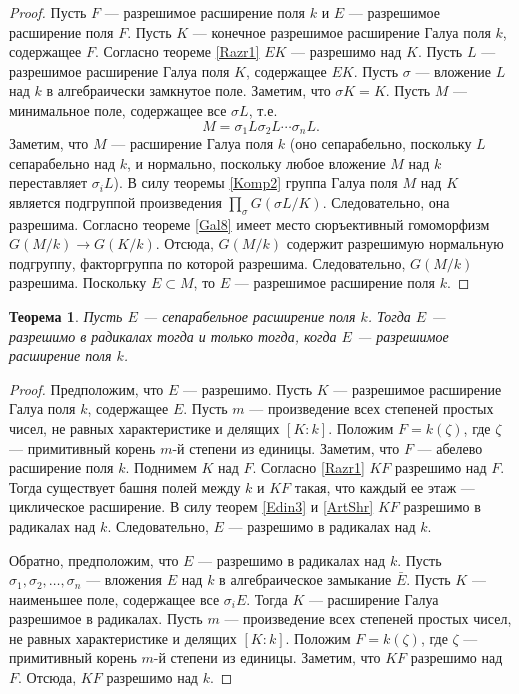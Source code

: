 \documentclass[12pt, titlepage, oneside]{amsbook}
\newtheorem{theorem}{Теорема}[chapter]
\theoremstyle{definition}
\theoremstyle{remark}
\begin{document}
\begin{proof}
Пусть $F$ --- разрешимое расширение поля $k$ и $E$ --- разрешимое расширение поля $F$. Пусть $K$ --- конечное разрешимое расширение Галуа поля $k$, содержащее $F$. Согласно теореме \ref{Razr1} $EK$ --- разрешимо над $K$. Пусть $L$ --- разрешимое расширение Галуа поля $K$, содержащее $EK$. Пусть $\sigma$ --- вложение $L$ над $k$ в алгебраически замкнутое поле. Заметим, что $\sigma K=K$. Пусть $M$ --- минимальное поле, содержащее все $\sigma L$, т.е. $$M=\sigma_1 L\sigma_2 L\cdots\sigma_n L.$$ Заметим, что $M$ --- расширение Галуа поля $k$ (оно сепарабельно, поскольку $L$ сепарабельно над $k$, и нормально, поскольку любое вложение $M$ над $k$ переставляет $\sigma_i L$). В силу теоремы \ref{Komp2} группа Галуа поля $M$ над $K$ является подгруппой произведения $\prod\limits_{\sigma} G(\sigma L/K)$. Следовательно, она разрешима. Согласно теореме \ref{Gal8} имеет место сюръективный гомоморфизм $G(M/k)\rightarrow G(K/k)$. Отсюда, $G(M/k)$ содержит разрешимую нормальную подгруппу, факторгруппа по которой разрешима. Следовательно, $G(M/k)$ разрешима. Поскольку $E\subset M$, то $E$ --- разрешимое расширение поля $k$.
\end{proof}

\begin{theorem}
\label{RazrRad}
Пусть $E$ --- сепарабельное расширение поля $k$. Тогда $E$ --- разрешимо в радикалах тогда и только тогда, когда $E$ --- разрешимое расширение поля $k$.
\end{theorem}


\begin{proof}
Предположим, что $E$ --- разрешимо. Пусть $K$ --- разрешимое расширение Галуа поля $k$, содержащее $E$. Пусть $m$ --- произведение всех степеней простых чисел, не равных характеристике и делящих $[K:k]$. Положим $F=k(\zeta)$, где $\zeta$ --- примитивный корень $m$-й степени из единицы. Заметим, что $F$ --- абелево расширение поля $k$. Поднимем $K$ над $F$. Согласно \ref{Razr1} $KF$ разрешимо над $F$. Тогда существует башня полей между $k$ и $KF$ такая, что каждый ее этаж --- циклическое расширение. В силу теорем \ref{Edin3} и \ref{ArtShr} $KF$ разрешимо в радикалах над $k$. Следовательно, $E$ --- разрешимо в радикалах над $k$.

Обратно, предположим, что $E$ --- разрешимо в радикалах над $k$. Пусть $\sigma_1,\sigma_2,\ldots,\sigma_n$ --- вложения $E$ над $k$ в алгебраическое замыкание $\bar{E}$. Пусть $K$ --- наименьшее поле, содержащее все $\sigma_i E$. Тогда $K$ --- расширение Галуа разрешимое в радикалах. Пусть $m$ --- произведение всех степеней простых чисел, не равных характеристике и делящих $[K:k]$. Положим $F=k(\zeta)$, где $\zeta$ --- примитивный корень $m$-й степени из единицы. Заметим, что $KF$ разрешимо над $F$. Отсюда, $KF$ разрешимо над $k$.
\end{proof}
\end{document}
